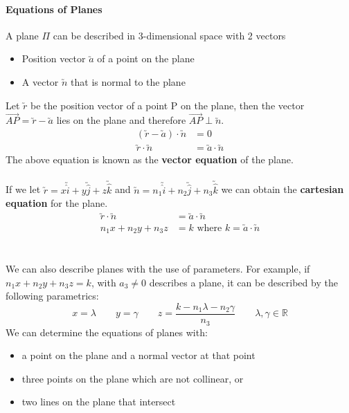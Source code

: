 \documentclass[a4paper,twoside]{article}
\begin{document}
			\paragraph{Equations of Planes} A plane $\Pi$ can be described in 3-dimensional space with 2 vectors
			\begin{itemize}
				\item Position vector $\utilde{a}$ of a point on the plane
				\item A vector $\utilde{n}$ that is normal to the plane
			\end{itemize}
			Let $\utilde{r}$ be the position vector of a point P on the plane, then the vector $\overrightarrow{AP}=\utilde{r}-\utilde{a}$ lies on the plane and therefore $\overrightarrow{AP}\perp\utilde{n}$.\\
			\begin{align*}
				(\utilde{r}-\utilde{a})\cdot\utilde{n}&=0 \\
				\utilde{r}\cdot\utilde{n}&=\utilde{a}\cdot\utilde{n}
			\end{align*}
			The above equation is known as the \textbf{vector equation} of the plane.\\\\
			If we let $\utilde{r}=x\utilde{\hat{i}}+y\utilde{\hat{j}}+z\utilde{\hat{k}}$ and $\utilde{n}=n_1\utilde{\hat{i}}+n_2\utilde{\hat{j}}+n_3\utilde{\hat{k}}$ we can obtain the \textbf{cartesian equation} for the plane.\\
			\begin{align*}
				\utilde{r}\cdot\utilde{n}&=\utilde{a}\cdot\utilde{n} \\
				n_1x+n_2y+n_3z&=k\text{ where }k=\utilde{a}\cdot\utilde{n}
			\end{align*}
			\\\\
			We can also describe planes with the use of parameters. For example, if $n_1x+n_2y+n_3z=k$, with $a_3\neq0$ describes a plane, it can be described by the following parametrics:
			\begin{equation*}
				x=\lambda \qquad y=\gamma \qquad z=\frac{k-n_1\lambda-n_2\gamma}{n_3} \qquad \lambda,\gamma\in\mathbb{R}
			\end{equation*}
			We can determine the equations of planes with:
			\begin{itemize}
				\item a point on the plane and a normal vector at that point
				\item three points on the plane which are not collinear, or
				\item two lines on the plane that intersect
			\end{itemize}
		
\end{document}
